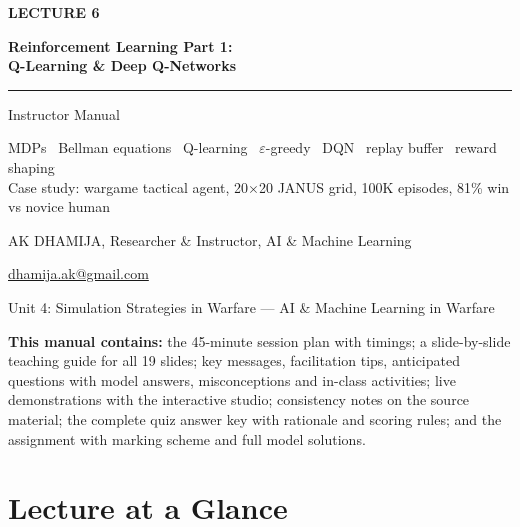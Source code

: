 \documentclass[11pt]{article}
\begin{document}
\begin{titlepage}\centering\vspace*{2.2cm}
{\color{AccN}\large\bfseries LECTURE 6\par}\vspace{0.6cm}
{\color{NavyN}\Huge\bfseries Reinforcement Learning Part 1:\\Q-Learning \& Deep Q-Networks\par}\vspace{0.6cm}
{\color{AccN}\rule{0.7\textwidth}{1.5pt}}\par\vspace{0.6cm}
{\LARGE Instructor Manual\par}\vspace{0.4cm}
{\large\begin{minipage}{0.85\textwidth}\centering MDPs \textbullet\ Bellman equations \textbullet\ Q-learning \textbullet\ $\varepsilon$-greedy \textbullet\ DQN \textbullet\ replay buffer \textbullet\ reward shaping\\Case study: wargame tactical agent, 20$\times$20 JANUS grid, 100K episodes, 81\% win vs novice human\end{minipage}\par}\vspace{2cm}
{\large AK DHAMIJA, Researcher \& Instructor, AI \& Machine Learning\par}\vspace{0.2cm}
{\normalsize \href{mailto:dhamija.ak@gmail.com}{dhamija.ak@gmail.com} \quad\textbullet{}\par}\vspace{0.3cm}
{Unit 4: Simulation Strategies in Warfare --- AI \& Machine Learning in Warfare\par}\vfill
\begin{tcolorbox}[colback=NavyN!4,colframe=NavyN,boxrule=0.6pt,arc=2pt,width=0.9\textwidth]\small
\textbf{This manual contains:} the 45-minute session plan with timings; a slide-by-slide teaching guide for all 19 slides; key messages, facilitation tips, anticipated questions with model answers, misconceptions and in-class activities; live demonstrations with the interactive studio; consistency notes on the source material; the complete quiz answer key with rationale and scoring rules; and the assignment with marking scheme and full model solutions.
\end{tcolorbox}
\end{titlepage}
\tableofcontents\newpage


\section{Lecture at a Glance}
\end{document}
